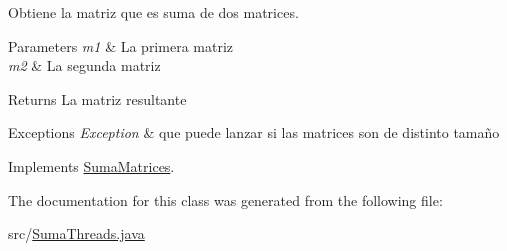 Obtiene la matriz que es suma de dos matrices. 


\begin{DoxyParams}{Parameters}
{\em m1} & La primera matriz \\
\hline
{\em m2} & La segunda matriz \\
\hline
\end{DoxyParams}
\begin{DoxyReturn}{Returns}
La matriz resultante 
\end{DoxyReturn}

\begin{DoxyExceptions}{Exceptions}
{\em Exception} & que puede lanzar si las matrices son de distinto tamaño \\
\hline
\end{DoxyExceptions}


Implements \hyperlink{interfaceSumaMatrices_aaa4f45720c4f880570897a307d78c60d}{Suma\-Matrices}.



The documentation for this class was generated from the following file\-:\begin{DoxyCompactItemize}
\item 
src/\hyperlink{SumaThreads_8java}{Suma\-Threads.\-java}\end{DoxyCompactItemize}
